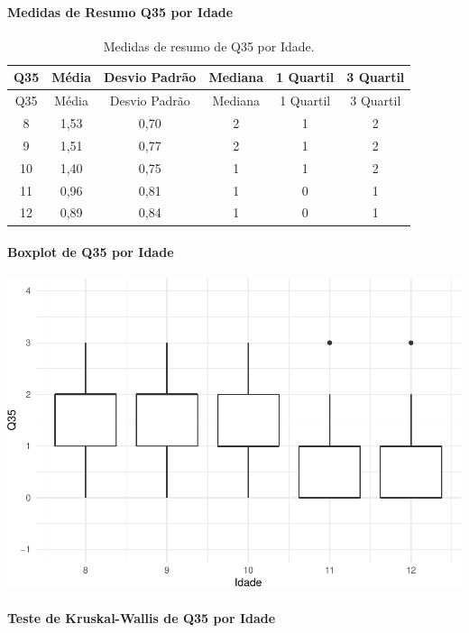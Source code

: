 \documentclass[]{article}
\let\oldparagraph\paragraph
\renewcommand{\paragraph}[1]{\oldparagraph{#1}\mbox{}}
\begin{document}
\cleardoublepage

\hypertarget{medidas-de-resumo-q35-por-idade}{%
\paragraph{Medidas de Resumo Q35 por Idade}\label{medidas-de-resumo-q35-por-idade}}

\begin{longtable}[]{@{}cccccc@{}}
\caption{\label{tab:unnamed-chunk-1276}Medidas de resumo de Q35 por Idade.}\tabularnewline
\toprule
Q35 & Média & Desvio Padrão & Mediana & 1 Quartil & 3 Quartil\tabularnewline
\midrule
\endfirsthead
\toprule
Q35 & Média & Desvio Padrão & Mediana & 1 Quartil & 3 Quartil\tabularnewline
\midrule
\endhead
8 & 1,53 & 0,70 & 2 & 1 & 2\tabularnewline
9 & 1,51 & 0,77 & 2 & 1 & 2\tabularnewline
10 & 1,40 & 0,75 & 1 & 1 & 2\tabularnewline
11 & 0,96 & 0,81 & 1 & 0 & 1\tabularnewline
12 & 0,89 & 0,84 & 1 & 0 & 1\tabularnewline
\bottomrule
\end{longtable}

\hypertarget{boxplot-de-q35-por-idade}{%
\paragraph{Boxplot de Q35 por Idade}\label{boxplot-de-q35-por-idade}}

\begin{center}\includegraphics[width=0.75\linewidth]{relatorio_covid19_files/figure-latex/unnamed-chunk-1277-1} \end{center}

\hypertarget{teste-de-kruskal-wallis-de-q35-por-idade}{%
\paragraph{Teste de Kruskal-Wallis de Q35 por Idade}\label{teste-de-kruskal-wallis-de-q35-por-idade}}
\end{document}
